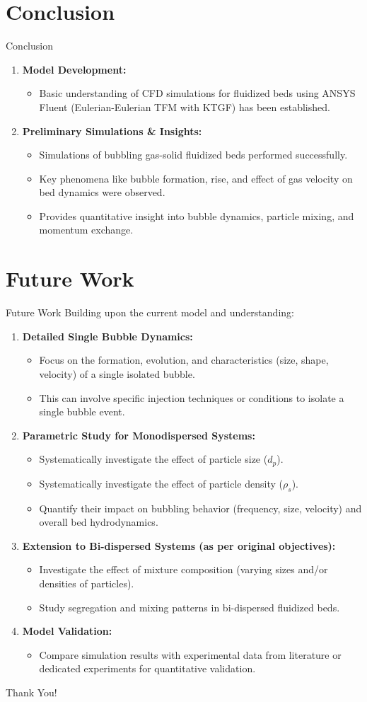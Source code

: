 \documentclass[aspectratio=169]{beamer} %
\newcommand{\bi}{\begin{itemize}}
\newcommand{\ei}{\end{itemize}}
\newcommand{\ben}{\begin{enumerate}}
\newcommand{\een}{\end{enumerate}}
\newcommand{\im}{\item}
\begin{document}
\section{Conclusion}
\begin{frame}{Conclusion}
    \ben
        \im \textbf{Model Development:}
            \bi
                \im Basic understanding of CFD simulations for fluidized beds using ANSYS Fluent (Eulerian-Eulerian TFM with KTGF) has been established.
            \ei
        \im \textbf{Preliminary Simulations \& Insights:}
            \bi
                \im Simulations of bubbling gas-solid fluidized beds performed successfully.
                \im Key phenomena like bubble formation, rise, and effect of gas velocity on bed dynamics were observed.
                \im Provides quantitative insight into bubble dynamics, particle mixing, and momentum exchange.
            \ei
    \een
    \vspace{1em}
\end{frame}

\section{Future Work}
\begin{frame}{Future Work}
    Building upon the current model and understanding:
    \ben
        \im \textbf{Detailed Single Bubble Dynamics:}
            \bi
                \im Focus on the formation, evolution, and characteristics (size, shape, velocity) of a single isolated bubble.
                \im This can involve specific injection techniques or conditions to isolate a single bubble event.
            \ei
        \im \textbf{Parametric Study for Monodispersed Systems:}
            \bi
                \im Systematically investigate the effect of particle size ($d_p$).
                \im Systematically investigate the effect of particle density ($\rho_s$).
                \im Quantify their impact on bubbling behavior (frequency, size, velocity) and overall bed hydrodynamics.
            \ei
        \im \textbf{Extension to Bi-dispersed Systems (as per original objectives):}
            \bi
                \im Investigate the effect of mixture composition (varying sizes and/or densities of particles).
                \im Study segregation and mixing patterns in bi-dispersed fluidized beds.
            \ei
        \im \textbf{Model Validation:}
            \bi
                \im Compare simulation results with experimental data from literature or dedicated experiments for quantitative validation.
            \ei
    \een
\end{frame}

\begin{frame}
    \centering
    \Huge Thank You!
    \vspace{2em}
\end{frame}
\end{document}
